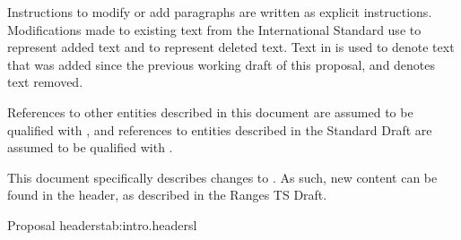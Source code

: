 \pnum
Instructions to modify or add paragraphs are written as explicit instructions.
Modifications made to existing text from the International Standard use
 to represent added text and  to
represent deleted text. Text in  is used to denote text that
was added since the previous working draft of this proposal, and 
denotes text removed.

\pnum
References to other entities described in this document are assumed to be
qualified with , and references to entities
described in the \Cpp Standard Draft are assumed to be qualified with .

\pnum
This document specifically describes changes to . As such, new content can be found
in the  header, as described in the Ranges TS Draft.

\begin{floattable}{Proposal headers}{tab:intro.headers}{l}
\topline
{}\\
\bottomline
\end{floattable}